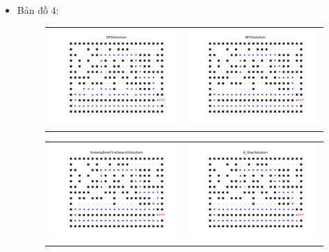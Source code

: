 \documentclass[11pt]{scrartcl} %
\begin{document}
\begin{itemize}
	
	\newpage
	\item Bản đồ 4:
	\begin{figure}[h] \label{bd4}
		\centering
		\begin{tabular}{cc}
			\includegraphics[width=8cm]{Figures/fg4_dfs.png} &
			\includegraphics[width=8cm]{Figures/fg4_bfs.png} \\
		\end{tabular}
	\end{figure}
	\begin{figure}[h] \label{Hình 4}
		\centering
		\begin{tabular}{cc}
			\includegraphics[width=8cm]{Figures/fg4_gbfs.png} &
			\includegraphics[width=8cm]{Figures/fg4_astar.png}

\end{tabular}
\end{figure}
\end{itemize}
\end{document}

